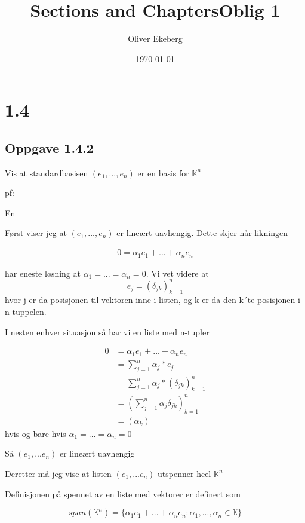 \documentclass[11pt]{article}
\title{Sections and Chapters}
\title{Oblig 1}
\author{Oliver Ekeberg}
\date{\today}
\begin{document}
\maketitle


\tableofcontents


\section{1.4}

\subsection{Oppgave 1.4.2}

Vis at standardbasisen $(e_1, ..., e_n)$ er en basis for $\mathbb{K}^n$

pf:

En 

\vspace{1em}
Først viser jeg at $(e_1,...,e_n)$ er lineært uavhengig. Dette skjer når likningen

\begin{align*}
    0 = \alpha_1 e_1 + ... + \alpha_n e_n     
\end{align*}

har eneste løsning at $\alpha_1=...=\alpha_n=0$. Vi vet videre at $$e_j = (\delta_{jk})^{n}_{k=1}$$ hvor j er da posisjonen til 
vektoren inne i listen, og k er da den k´te posisjonen i n-tuppelen. 

I nesten enhver situasjon så har vi en liste med n-tupler

\begin{align*}
    0 &= \alpha_1 e_1 + ... + \alpha_n e_n \\
    &= \sum_{j=1}^{n} \alpha_j * e_j \\
    &= \sum_{j=1}^{n} \alpha_j * (\delta_{jk})^{n}_{k=1} \\
    &= (\sum_{j=1}^{n} \alpha_j \delta_{jk})^n_{k=1} \\
    &= (\alpha_k)
\end{align*}
hvis og bare hvis $\alpha_1= ... = \alpha_n = 0$  

Så $(e_1,...e_n)$ er lineært uavhengig

\vspace{1em}
Deretter må jeg vise at listen $(e_1,...e_n)$ utspenner heel $\mathbb{K}^n$

Definisjonen på spennet av en liste med vektorer er definert som

$$
span(\mathbb{K}^n) = \{ \alpha_1 e_1 + ... + \alpha_n e_n  : \alpha_1,...,\alpha_n \in \mathbb{K} \}
$$
\end{document}
